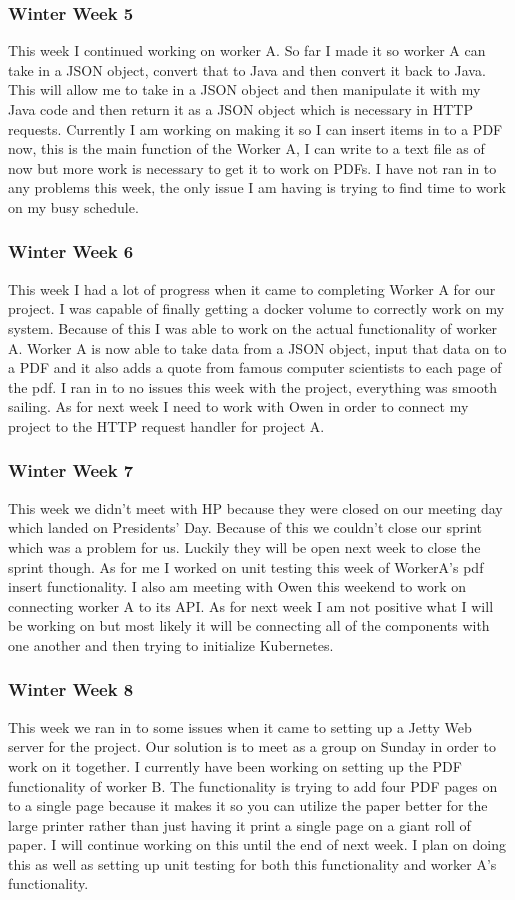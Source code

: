 \documentclass[onecolumn, draftclsnofoot,10pt, compsoc]{IEEEtran}
\begin{document}
\subsubsection*{Winter Week 5}
This week I continued working on worker A. So far I made it so worker A can take in a JSON object, convert that to Java and then convert it back to Java. This will allow me to take in a JSON object and then manipulate it with my Java code and then return it as a JSON object which is necessary in HTTP requests. Currently I am working on making it so I can insert items in to a PDF now, this is the main function of the Worker A, I can write to a text file as of now but more work is necessary to get it to work on PDFs. I have not ran in to any problems this week, the only issue I am having is trying to find time to work on my busy schedule.
\subsubsection*{Winter Week 6}
This week I had a lot of progress when it came to completing Worker A for our project. I was capable of finally getting a docker volume to correctly work on my system. Because of this I was able to work on the actual functionality of worker A. Worker A is now able to take data from a JSON object, input that data on to a PDF and it also adds a quote from famous computer scientists to each page of the pdf. I ran in to no issues this week with the project, everything was smooth sailing. As for next week I need to work with Owen in order to connect my project to the HTTP request handler for project A. 
\subsubsection*{Winter Week 7}
This week we didn’t meet with HP because they were closed on our meeting day which landed on Presidents’ Day. Because of this we couldn’t close our sprint which was a problem for us. Luckily they will be open next week to close the sprint though. As for me I worked on unit testing this week of WorkerA’s pdf insert functionality. I also am meeting with Owen this weekend to work on connecting worker A to its API. As for next week I am not positive what I will be working on but most likely it will be connecting all of the components with one another and then trying to initialize Kubernetes.
\subsubsection*{Winter Week 8}
This week we ran in to some issues when it came to setting up a Jetty Web server for the project. Our solution is to meet as a group on Sunday in order to work on it together. I currently have been working on setting up the PDF functionality of worker B. The functionality is trying to add four PDF pages on to a single page because it makes it so you can utilize the paper better for the large printer rather than just having it print a single page on a giant roll of paper. I will continue working on this until the end of next week. I plan on doing this as well as setting up unit testing for both this functionality and worker A's functionality. 
\end{document}
